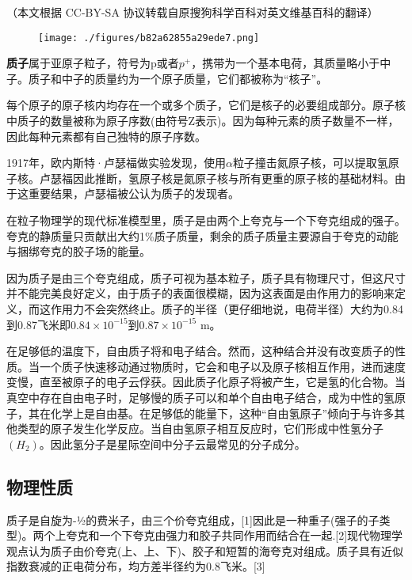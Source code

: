 
（本文根据 CC-BY-SA 协议转载自原搜狗科学百科对英文维基百科的翻译）

\begin{figure}[ht]
\centering
\texttt{[image: ./figures/b82a62855a29ede7.png]}
\caption \label{fig_Proton_7}
\end{figure}

\textbf{质子}属于亚原子粒子，符号为p或者$p^+$，携带为一个基本电荷，其质量略小于中子。质子和中子的质量约为一个原子质量，它们都被称为“核子”。

每个原子的原子核内均存在一个或多个质子，它们是核子的必要组成部分。原子核中质子的数量被称为原子序数(由符号Z表示)。因为每种元素的质子数量不一样，因此每种元素都有自己独特的原子序数。

1917年，欧内斯特·卢瑟福做实验发现，使用$\alpha$粒子撞击氮原子核，可以提取氢原子核。卢瑟福因此推断，氢原子核是氮原子核与所有更重的原子核的基础材料。由于这重要结果，卢瑟福被公认为质子的发现者。

在粒子物理学的现代标准模型里，质子是由两个上夸克与一个下夸克组成的强子。夸克的静质量只贡献出大约1\%质子质量，剩余的质子质量主要源自于夸克的动能与捆绑夸克的胶子场的能量。

因为质子是由三个夸克组成，质子可视为基本粒子，质子具有物理尺寸，但这尺寸并不能完美良好定义，由于质子的表面很模糊，因为这表面是由作用力的影响来定义，而这作用力不会突然终止。质子的半径（更仔细地说，电荷半径）大约为0.84到0.87飞米即$0.84\times10^{-15}$到$0.87\times10^{-15}$ m。

在足够低的温度下，自由质子将和电子结合。然而，这种结合并没有改变质子的性质。当一个质子快速移动通过物质时，它会和电子以及原子核相互作用，进而速度变慢，直至被原子的电子云俘获。因此质子化原子将被产生，它是氢的化合物。当真空中存在自由电子时，足够慢的质子可以和单个自由电子结合，成为中性的氢原子，其在化学上是自由基。在足够低的能量下，这种“自由氢原子”倾向于与许多其他类型的原子发生化学反应。当自由氢原子相互反应时，它们形成中性氢分子$(H_2)$。因此氢分子是星际空间中分子云最常见的分子成分。

\subsection{物理性质}
质子是自旋为-½的费米子，由三个价夸克组成，[1]因此是一种重子(强子的子类型)。两个上夸克和一个下夸克由强力和胶子共同作用而结合在一起.[2]现代物理学观点认为质子由价夸克(上、上、下)、胶子和短暂的海夸克对组成。质子具有近似指数衰减的正电荷分布，均方差半径约为0.8飞米。[3]


